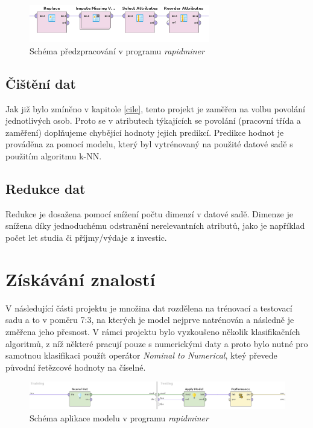 \documentclass[11pt,a4paper,titlepage]{article}
\begin{document}
        \begin{figure}[H]
            \centering
            \includegraphics[width=0.7\textwidth]{./img/predzpracovani.png}
            \caption{Schéma předzpracování v programu \textit{rapidminer}}
        \end{figure}
        
        \subsection{Čištění dat}
            Jak již bylo zmíněno v kapitole \ref{cile}, tento projekt je zaměřen na volbu povolání jednotlivých osob. Proto se v atributech týkajících se povolání (pracovní třída a zaměření) doplňujeme chybějící hodnoty jejich predikcí. Predikce hodnot je prováděna za pomocí modelu, který byl vytrénovaný na použité datové sadě s použitím algoritmu k-NN.
        
        \subsection{Redukce dat}
            Redukce je dosažena pomocí snížení počtu dimenzí v datové sadě. Dimenze je snížena díky jednoduchému odstranění nerelevantních atributů, jako je například
            počet let studia či příjmy/výdaje z investic.
    
    \section{Získávání znalostí}
        V následující části projektu je množina dat rozdělena na trénovací a testovací sadu a to v poměru 7:3, na kterých je model nejprve natrénován a následně je změřena jeho přesnost. V rámci projektu bylo vyzkoušeno několik klasifikačních algoritmů, z níž některé pracují pouze s numerickými daty a proto bylo nutné pro samotnou klasifikaci použít operátor \textit{Nominal to Numerical}, kteý převede původní řetězcové hodnoty na číselné.

        \begin{figure}[H]
            \centering
            \includegraphics[width=1\textwidth]{./img/zpracovani.png}
            \caption{Schéma aplikace modelu v programu \textit{rapidminer}}
        \end{figure}
\end{document}
